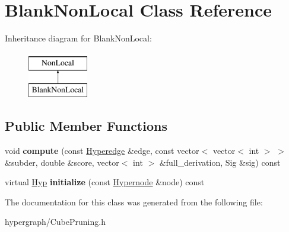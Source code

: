 \hypertarget{classBlankNonLocal}{
\section{BlankNonLocal Class Reference}
\label{classBlankNonLocal}
}
Inheritance diagram for BlankNonLocal:\begin{figure}[H]
\begin{center}
\leavevmode
\includegraphics[height=2cm]{classBlankNonLocal}
\end{center}
\end{figure}
\subsection*{Public Member Functions}
\begin{DoxyCompactItemize}
\item 
\hypertarget{classBlankNonLocal_ab48fb9f176d5b929aaa724e3f5b32a6a}{
void {\bfseries compute} (const \hyperlink{classScarab_1_1HG_1_1Hyperedge}{Hyperedge} \&edge, const vector$<$ vector$<$ int $>$ $>$ \&subder, double \&score, vector$<$ int $>$ \&full\_\-derivation, Sig \&sig) const }
\label{classBlankNonLocal_ab48fb9f176d5b929aaa724e3f5b32a6a}

\item 
\hypertarget{classBlankNonLocal_a61e2ac11c599d217cacfa5c54bd191b8}{
virtual \hyperlink{structHyp}{Hyp} {\bfseries initialize} (const \hyperlink{classScarab_1_1HG_1_1Hypernode}{Hypernode} \&node) const }
\label{classBlankNonLocal_a61e2ac11c599d217cacfa5c54bd191b8}

\end{DoxyCompactItemize}


The documentation for this class was generated from the following file:\begin{DoxyCompactItemize}
\item 
hypergraph/CubePruning.h\end{DoxyCompactItemize}
